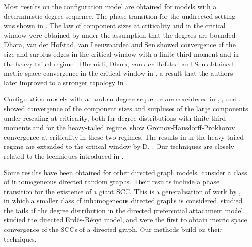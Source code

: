 Most results on the configuration model are obtained for models with a deterministic degree sequence. The phase transition for the undirected setting was shown in \cite{molloyCriticalPointRandom1995, Molloy1998, Janson2009}. The law of component sizes at criticality and in the critical window were obtained by \citet{Riordan2012} under the assumption that the degrees are bounded. Dhara, van der Hofstad, van Leeuwaarden and Sen showed convergence of the size and surplus edges in the critical window with a finite third moment \cite{Dhara2017} and in the heavy-tailed regime \cite{Dhara2020}.  Bhamidi, Dhara, van der Hofstad and Sen obtained metric space convergence in the critical window in \cite{Bhamidi2020}, a result that the authors later improved to a stronger topology in \cite{Bhamidi2020Glmb}. 

Configuration models with a random degree sequence are considered in \cite{josephComponentSizesCritical2014}, \cite{conchon--kerjanStableGraphMetric2020}, and \cite{Donderwinkel2021heightprocess}. \citet{josephComponentSizesCritical2014} showed convergence of the component sizes and surpluses of the large components under rescaling at criticality, both for degree distributions with finite third moments and for the heavy-tailed regime. \citet{conchon--kerjanStableGraphMetric2020} show Gromov-Hausdorff-Prokhorov convergence at criticality in these two regimes. The results in \cite{conchon--kerjanStableGraphMetric2020} in the heavy-tailed regime are extended to the critical window by D. \cite{Donderwinkel2021heightprocess}. Our techniques are closely related to the techniques introduced in \cite{conchon--kerjanStableGraphMetric2020}. 

Some results have been obtained for other directed graph models. \citet{caoConnectivityGeneralClass2019} consider a class of inhomogeneous directed random graphs. Their results include a phase transition for the existence of a giant SCC. This is a generalisation of work by \citet{Bloznelis2012}, in which a smaller class of inhomogeneous directed graphs is considered. \citet{Samorodnitsky2016} studied the tails of the degree distribution in the directed preferential attachment model. \citet{goldschmidtScalingLimitCritical2019} studied the directed Erd\H{o}s-R\'enyi model, and were the first to obtain metric space convergence of the SCCs of a directed graph. Our methods build on their techniques.

